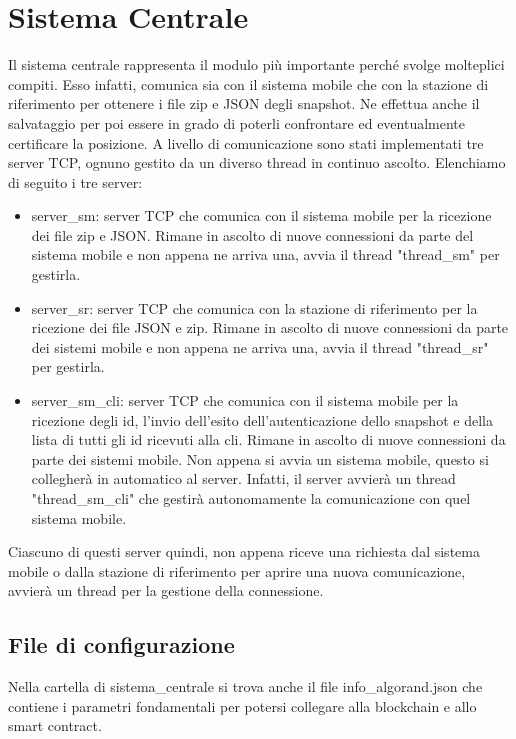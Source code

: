 \section{Sistema Centrale}
Il sistema centrale rappresenta il modulo più importante perché svolge molteplici compiti. Esso infatti, comunica sia con il sistema mobile che con la stazione di riferimento per ottenere i file zip e JSON degli snapshot. Ne effettua anche il salvataggio per poi essere in grado di poterli confrontare ed eventualmente certificare la posizione.
A livello di comunicazione sono stati implementati tre server TCP, ognuno gestito da un diverso thread in continuo ascolto. Elenchiamo di seguito i tre server:
\begin{itemize}
    \item server\_sm: server TCP che comunica con il sistema mobile per la ricezione dei file zip e JSON. Rimane in ascolto di nuove connessioni da parte del sistema mobile e non appena ne arriva una, avvia il thread "thread\_sm" per gestirla.
    \item server\_sr: server TCP che comunica con la stazione di riferimento per la ricezione dei file JSON e zip. Rimane in ascolto di nuove connessioni da  parte dei sistemi mobile e non appena ne arriva una, avvia il thread "thread\_sr" per gestirla.
    \item server\_sm\_cli: server TCP che comunica con il sistema mobile per la ricezione degli id, l'invio dell'esito dell'autenticazione dello snapshot e della lista di tutti gli id ricevuti alla cli. Rimane in ascolto di nuove connessioni da parte dei sistemi mobile. Non appena si avvia un sistema mobile, questo si collegherà in automatico al server. Infatti, il server avvierà un thread "thread\_sm\_cli" che gestirà autonomamente la comunicazione con quel sistema mobile.
\end{itemize}
Ciascuno di questi server quindi, non appena riceve una richiesta dal sistema mobile o dalla stazione di riferimento per aprire una nuova comunicazione, avvierà un thread per la gestione della connessione.

\subsection{File di configurazione}
Nella cartella di sistema\_centrale si trova anche il file info\_algorand.json che contiene i parametri fondamentali per potersi collegare alla blockchain e allo smart contract. 


